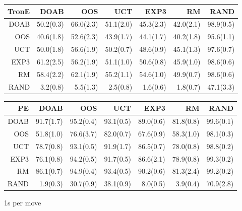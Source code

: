 \begin{figure}
\begin{footnotesize}
\begin{tabular}{|r|rrrrrr|}
TronE&DOAB&OOS&UCT&EXP3&RM&RAND\\\hline
DOAB&50.2(0.3)&66.0(2.3)&51.1(2.0)&45.3(2.3)&42.0(2.1)&98.9(0.5)\\
OOS&40.6(1.8)&52.6(2.3)&43.9(1.7)&44.1(1.7)&40.2(1.8)&95.6(1.1)\\
UCT&50.0(1.8)&56.6(1.9)&50.2(0.7)&48.6(0.9)&45.1(1.3)&97.6(0.7)\\
EXP3&61.2(2.5)&56.2(1.9)&51.1(1.0)&50.6(0.8)&45.9(1.0)&98.6(0.6)\\
RM&58.4(2.2)&62.1(1.9)&55.2(1.1)&54.6(1.0)&49.9(0.7)&98.6(0.6)\\
RAND&3.2(0.8)&5.5(1.3)&2.5(0.8)&1.6(0.6)&1.8(0.7)&47.1(3.3)\\
\hline
\end{tabular}
\begin{tabular}{|r|rrrrrr|}\hline
PE&DOAB&OOS&UCT&EXP3&RM&RAND\\\hline
DOAB&91.7(1.7)&95.2(0.4)&93.1(0.5)&89.0(0.6)&81.8(0.8)&99.6(0.1)\\
OOS&51.8(1.0)&76.6(3.7)&82.0(0.7)&67.6(0.9)&58.3(1.0)&98.1(0.3)\\
UCT&78.7(0.8)&93.1(0.5)&91.9(1.7)&86.5(0.7)&78.0(0.8)&98.8(0.2)\\
EXP3&76.1(0.8)&94.2(0.5)&91.7(0.5)&86.6(2.1)&78.9(0.8)&99.3(0.2)\\
RM&86.1(0.7)&94.9(0.4)&93.4(0.5)&90.2(0.6)&81.3(2.4)&99.2(0.2)\\
RAND&1.9(0.3)&30.7(0.9)&38.1(0.9)&8.0(0.5)&3.9(0.4)&70.9(2.8)\\
\hline
\end{tabular}

\end{footnotesize}
\caption{1s per move}
\end{figure}


